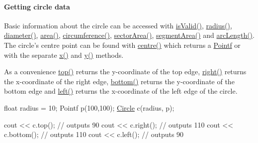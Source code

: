 \paragraph*{Getting circle data}

Basic information about the circle can be accessed with \hyperlink{classprism_1_1geometry_1_1_circle_ae03e53948818ee2a81e94180bf74cb75}{is\+Valid()}, \hyperlink{classprism_1_1geometry_1_1_circle_aef97382c1f0b09dca59a0534ac03ed1b}{radius()}, \hyperlink{classprism_1_1geometry_1_1_circle_adf30d4b56a2d060dfd5a44172a7e088e}{diameter()}, \hyperlink{classprism_1_1geometry_1_1_circle_a7de6fb3380d1365d537a5c407cf3511e}{area()}, \hyperlink{classprism_1_1geometry_1_1_circle_ae259eb1b25728019cc7b3525f20ea1c8}{circumference()}, \hyperlink{classprism_1_1geometry_1_1_circle_ac4151db62b33dc1f0eaaa0280f3334b7}{sector\+Area()}, \hyperlink{classprism_1_1geometry_1_1_circle_af11d03eb5478214c8680c3f5447b268d}{segment\+Area()} and \hyperlink{classprism_1_1geometry_1_1_circle_a5935fdad61c2fda37981723fe4e3a0a7}{arc\+Length()}. The circle’s centre point can be found with \hyperlink{classprism_1_1geometry_1_1_circle_afc772e00d2928c2da666ef43463d1b9d}{centre()} which returns a \hyperlink{classprism_1_1geometry_1_1_pointf}{Pointf} or with the separate \hyperlink{classprism_1_1geometry_1_1_circle_aeb38df0ed8d1b3b84c4eb42b50a05348}{x()} and \hyperlink{classprism_1_1geometry_1_1_circle_aea5997071a76ee672b6b7ec0908ebe11}{y()} methods.

As a convenience \hyperlink{classprism_1_1geometry_1_1_circle_a52bda730f4f2b90a2f1817e4efaea158}{top()} returns the y-\/coordinate of the top edge, \hyperlink{classprism_1_1geometry_1_1_circle_a72e405496fec43913c26325f115755c0}{right()} returns the x-\/coordinate of the right edge, \hyperlink{classprism_1_1geometry_1_1_circle_aa7a9e06091ac1ae38b01d154b5a68f41}{bottom()} returns the y-\/coordinate of the bottom edge and \hyperlink{classprism_1_1geometry_1_1_circle_a10d1243c18b74798f1dd59793022ac83}{left()} returns the x-\/coordinate of the left edge of the circle.


\begin{DoxyCode}
\textcolor{keywordtype}{float} radius = 10;
Pointf p(100,100);
\hyperlink{classprism_1_1geometry_1_1_circle_a7d9e34947cf139b50f5730ed7711b4a4}{Circle} c(radius, p);

cout << c.top(); \textcolor{comment}{// outputs 90}
cout << c.right(); \textcolor{comment}{// outputs 110}
cout << c.bottom(); \textcolor{comment}{// outputs 110}
cout << c.left(); \textcolor{comment}{// outputs 90}
\end{DoxyCode}


